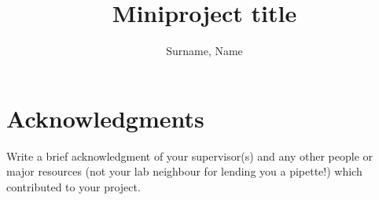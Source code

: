 \documentclass[11pt]{article}
\title{\LARGE{Miniproject title}}
\author{Surname, Name}
\begin{document}
	\maketitle
	\onehalfspacing
	
    
    
    
    


\section*{Acknowledgments}
Write a brief acknowledgment of your supervisor(s) and any other people or major resources (not your lab neighbour for lending you a pipette!) which contributed to your project.

       
\end{document}
